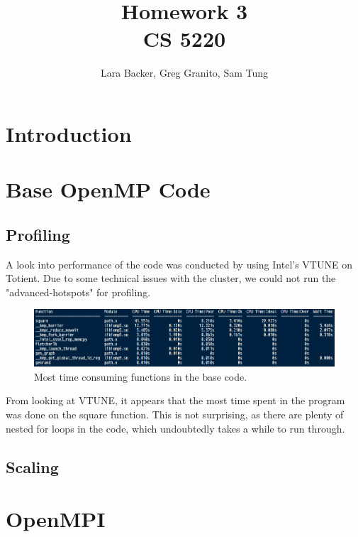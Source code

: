 \documentclass{article}
\begin{document}
\title{Homework 3 \\CS 5220}
\author{Lara Backer, Greg Granito, Sam Tung}

\maketitle

\section{Introduction}

\section{Base OpenMP Code}

\subsection{Profiling}
A look into performance of the code was conducted by using Intel's VTUNE on Totient. Due to some technical issues with the cluster, we could not run the "advanced-hotspots" for profiling. 
	\begin{figure}[h!]
		\begin{center}
			\includegraphics[width=0.7\columnwidth]{amplxe}
			\caption{Most time consuming functions in the base code.}
			\label{amplxe}
		\end{center}
	\end{figure}
	
From looking at VTUNE, it appears that the most time spent in the program was done on the square function. This is not surprising, as there are plenty of nested for loops in the code, which undoubtedly takes a while to run through.

\subsection{Scaling}

\section{OpenMPI}
\end{document}

